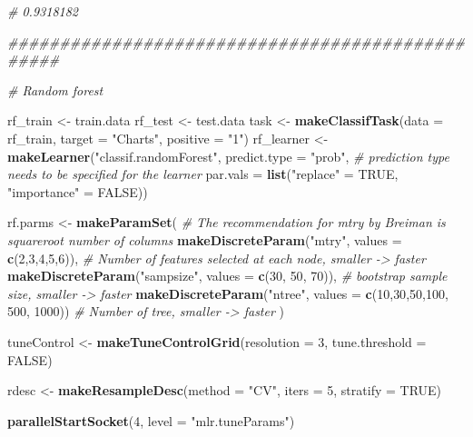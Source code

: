 \documentclass[
]{article}
\newenvironment{Shaded}{\begin{snugshade}}{\end{snugshade}}
\newcommand{\CommentTok}[1]{\textcolor[rgb]{0.56,0.35,0.01}{\textit{#1}}}
\newcommand{\DataTypeTok}[1]{\textcolor[rgb]{0.13,0.29,0.53}{#1}}
\newcommand{\DecValTok}[1]{\textcolor[rgb]{0.00,0.00,0.81}{#1}}
\newcommand{\KeywordTok}[1]{\textcolor[rgb]{0.13,0.29,0.53}{\textbf{#1}}}
\newcommand{\NormalTok}[1]{#1}
\newcommand{\OtherTok}[1]{\textcolor[rgb]{0.56,0.35,0.01}{#1}}
\newcommand{\StringTok}[1]{\textcolor[rgb]{0.31,0.60,0.02}{#1}}
\begin{document}
\begin{Shaded}
\begin{Highlighting}[]
\CommentTok{# 0.9318182}

\CommentTok{#################################################}

\CommentTok{# Random forest}

\NormalTok{rf_train <-}\StringTok{ }\NormalTok{train.data}
\NormalTok{rf_test <-}\StringTok{ }\NormalTok{test.data}
\NormalTok{task <-}\StringTok{ }\KeywordTok{makeClassifTask}\NormalTok{(}\DataTypeTok{data =}\NormalTok{ rf_train, }\DataTypeTok{target =} \StringTok{"Charts"}\NormalTok{, }\DataTypeTok{positive =} \StringTok{"1"}\NormalTok{)}
\NormalTok{rf_learner <-}\StringTok{ }\KeywordTok{makeLearner}\NormalTok{(}\StringTok{"classif.randomForest"}\NormalTok{, }
                          \DataTypeTok{predict.type =} \StringTok{"prob"}\NormalTok{, }\CommentTok{# prediction type needs to be specified for the learner }
                          \DataTypeTok{par.vals =} \KeywordTok{list}\NormalTok{(}\StringTok{"replace"}\NormalTok{ =}\StringTok{ }\OtherTok{TRUE}\NormalTok{, }\StringTok{"importance"}\NormalTok{ =}\StringTok{ }\OtherTok{FALSE}\NormalTok{))}

\NormalTok{rf.parms <-}\StringTok{ }\KeywordTok{makeParamSet}\NormalTok{(}
  \CommentTok{# The recommendation for mtry by Breiman is squareroot number of columns}
  \KeywordTok{makeDiscreteParam}\NormalTok{(}\StringTok{"mtry"}\NormalTok{, }\DataTypeTok{values =} \KeywordTok{c}\NormalTok{(}\DecValTok{2}\NormalTok{,}\DecValTok{3}\NormalTok{,}\DecValTok{4}\NormalTok{,}\DecValTok{5}\NormalTok{,}\DecValTok{6}\NormalTok{)), }\CommentTok{# Number of features selected at each node, smaller -> faster}
  \KeywordTok{makeDiscreteParam}\NormalTok{(}\StringTok{"sampsize"}\NormalTok{, }\DataTypeTok{values =}  \KeywordTok{c}\NormalTok{(}\DecValTok{30}\NormalTok{, }\DecValTok{50}\NormalTok{, }\DecValTok{70}\NormalTok{)), }\CommentTok{# bootstrap sample size, smaller -> faster}
  \KeywordTok{makeDiscreteParam}\NormalTok{(}\StringTok{"ntree"}\NormalTok{, }\DataTypeTok{values =} \KeywordTok{c}\NormalTok{(}\DecValTok{10}\NormalTok{,}\DecValTok{30}\NormalTok{,}\DecValTok{50}\NormalTok{,}\DecValTok{100}\NormalTok{, }\DecValTok{500}\NormalTok{, }\DecValTok{1000}\NormalTok{)) }\CommentTok{# Number of tree, smaller -> faster}
\NormalTok{) }

\NormalTok{tuneControl <-}\StringTok{ }\KeywordTok{makeTuneControlGrid}\NormalTok{(}\DataTypeTok{resolution =} \DecValTok{3}\NormalTok{, }\DataTypeTok{tune.threshold =} \OtherTok{FALSE}\NormalTok{)}

\NormalTok{rdesc <-}\StringTok{ }\KeywordTok{makeResampleDesc}\NormalTok{(}\DataTypeTok{method =} \StringTok{"CV"}\NormalTok{, }\DataTypeTok{iters =} \DecValTok{5}\NormalTok{, }\DataTypeTok{stratify =} \OtherTok{TRUE}\NormalTok{)}

\KeywordTok{parallelStartSocket}\NormalTok{(}\DecValTok{4}\NormalTok{, }\DataTypeTok{level =} \StringTok{"mlr.tuneParams"}\NormalTok{)}
\end{Highlighting}
\end{Shaded}
\end{document}
